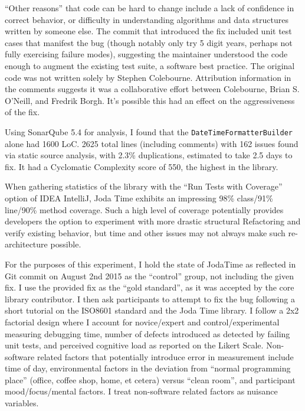 “Other reasons” that code can be hard to change include a lack of confidence in correct behavior, or difficulty in understanding algorithms and data structures written by someone else. The commit that introduced the fix included unit test cases that manifest the bug (though notably only try 5 digit years, perhaps not fully exercising failure modes), suggesting the maintainer understood the code enough to augment the existing test suite, a software best practice. The original code was not written solely by Stephen Colebourne. Attribution information in the comments suggests it was a collaborative effort between Colebourne, Brian S. O’Neill, and Fredrik Borgh. It’s possible this had an effect on the aggressiveness of the fix.

Using SonarQube 5.4 for analysis, I found that the \texttt{DateTimeFormatterBuilder} alone had 1600 LoC. 2625 total lines (including comments) with 162 issues found via static source analysis, with 2.3\% duplications, estimated to take 2.5 days to fix. It had a Cyclomatic Complexity score of 550, the highest in the library.

When gathering statistics of the library with the “Run Tests with Coverage” option of IDEA IntelliJ, Joda Time exhibits an impressing 98\% class/91\% line/90\% method coverage. Such a high level of coverage potentially provides developers the option to experiment with more drastic structural Refactoring and verify existing behavior, but time and other issues may not always make such re-architecture possible.	 	 

For the purposes of this experiment, I hold the state of JodaTime as reflected in Git commit on August 2nd 2015 as the “control” group, not including the given fix. I use the provided fix as the “gold standard”, as it was accepted by the core library contributor. I then ask participants to attempt to fix the bug following a short tutorial on the ISO8601 standard and the Joda Time library. I follow a 2x2 factorial design where I account for novice/expert and control/experimental measuring debugging time, number of defects introduced as detected by failing unit tests, and perceived cognitive load as reported on the Likert Scale. Non-software related factors that potentially introduce error in measurement include time of day, environmental factors in the deviation from “normal programming place” (office, coffee shop, home, et cetera) versus “clean room”, and participant mood/focus/mental factors. I treat non-software related factors as nuisance variables.

